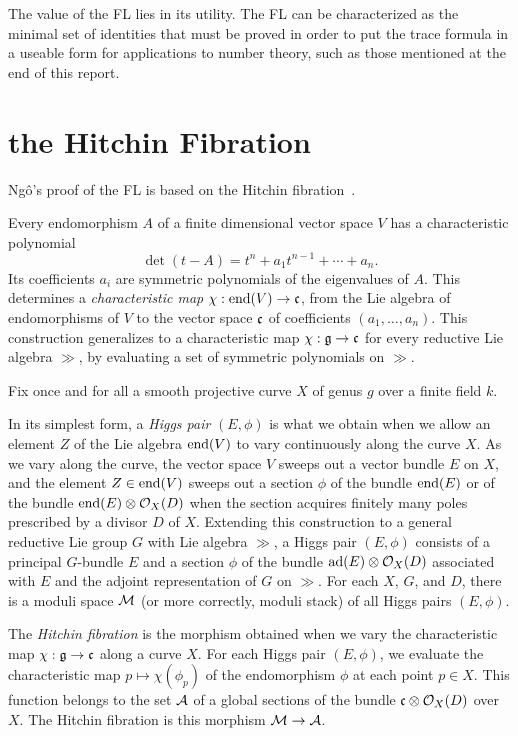 The value of the FL lies in its utility.  The FL can be characterized
as the minimal set of identities that must be proved in order to put
the trace formula in a useable form for applications to number theory, such as those
mentioned at the end of this report.

\section{the Hitchin Fibration}

Ng\^o's proof of the FL is based on the Hitchin fibration~\cite{Hitchin:87}.

Every endomorphism $A$
of a finite dimensional vector space $V$ has a characteristic polynomial
\begin{equation}
\det(t - A) = t^n + a_1 t^{n-1} + \cdots +a_n.
\end{equation}
Its coefficients $a_i$ are symmetric polynomials of the eigenvalues of
$A$.  This determines a {\it characteristic map} $\chi:\op{end}(V) \to
\cc$, from the Lie algebra of endomorphisms of $V$ to the vector space
$\cc$ of coefficients $(a_1,\ldots,a_n)$.  This construction
generalizes to a characteristic map $\chi:\gg\to \cc$ for every
reductive Lie algebra $\gg$, by evaluating a set of symmetric
polynomials on $\gg$.

Fix once and for all a smooth projective
curve $X$ of genus $g$ over a finite field $k$.  

In its simplest form, a {\it Higgs pair} $(E,\phi)$
is what we obtain when we allow an element $Z$ of the Lie
algebra $\op{end}(V)$ to vary continuously along the curve $X$.  
As we vary along the curve, the vector space $V$ sweeps out a vector
bundle $E$ on $X$, and the element $Z\in\op{end}(V)$ sweeps out a
section $\phi$ of the bundle $\op{end}(E)$ or of the bundle
$\op{end}(E)\otimes {\OO}_X(D)$ when the section acquires finitely
many poles prescribed by a divisor $D$ of $X$.  Extending this
construction to a general reductive Lie group $G$ with Lie algebra
$\gg$, a Higgs pair $(E,\phi)$ consists of a principal $G$-bundle $E$
and a section $\phi$ of the bundle $\op{ad}(E)\otimes {\OO}_X(D)$
associated with $E$ and the adjoint representation of $G$ on $\gg$.
For each $X$, $G$, and $D$, there is a moduli space ${\MM}$ (or more
correctly, moduli stack) of all Higgs pairs $(E,\phi)$.

The {\it Hitchin fibration} is the morphism obtained when we vary the
characteristic map $\chi:\gg\to \cc$  along a
curve $X$.  For each Higgs pair $(E,\phi)$, we evaluate the
characteristic map $p\mapsto \chi(\phi_p)$ of the endomorphism $\phi$
at each point $p\in X$. This function belongs to the set $\AA$ of a
global sections of the bundle $\cc\otimes {\OO}_X(D)$ over $X$.  The
Hitchin fibration is this morphism ${\MM}\to {\AA}$.

